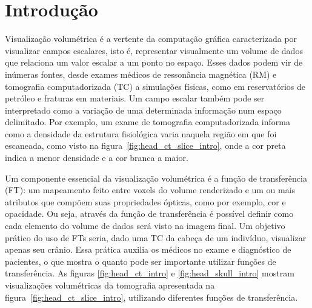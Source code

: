 
\chapter{Introdução}
\label{intro}
	Visualização volumétrica é a vertente da computação gráfica caracterizada por visualizar campos escalares, isto é, representar visualmente um volume de dados que relaciona um valor escalar a um ponto no espaço. Esses dados podem vir de inúmeras fontes, desde exames médicos de ressonância magnética (RM) e tomografia computadorizada (TC) a simulações físicas, como em reservatórios de petróleo e fraturas em materiais. Um campo escalar também pode ser interpretado como a variação de uma determinada informação num espaço delimitado. Por exemplo, um exame de tomografia computadorizada informa como a densidade da estrutura fisiológica varia naquela região em que foi escaneada, como visto na figura~\ref{fig:head_ct_slice_intro}, onde a cor preta indica a menor densidade e a cor branca a maior.
    
    Um componente essencial da visualização volumétrica é a função de transferência (FT): um mapeamento feito entre voxels do volume renderizado e um ou mais atributos que compõem suas propriedades ópticas, como por exemplo, cor e opacidade. Ou seja, através da função de transferência é possível definir como cada elemento do volume de dados será visto na imagem final. Um objetivo prático do uso de FTs seria, dado uma TC da cabeça de um indivíduo, visualizar apenas seu crânio. Essa prática auxilia os médicos no exame e diagnóstico de pacientes, o que mostra o quanto pode ser importante utilizar funções de transferência. As figuras \ref{fig:head_ct_intro} e \ref{fig:head_skull_intro} mostram visualizações volumétricas da tomografia apresentada na figura~\ref{fig:head_ct_slice_intro}, utilizando diferentes funções de transferência.

